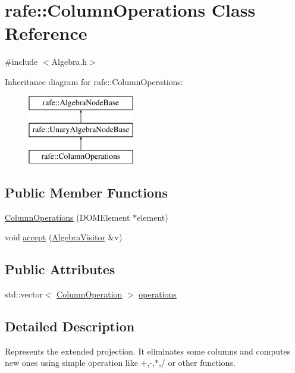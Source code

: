 \hypertarget{classrafe_1_1_column_operations}{\section{rafe\+:\+:Column\+Operations Class Reference}
\label{classrafe_1_1_column_operations}
}


{\ttfamily \#include $<$Algebra.\+h$>$}

Inheritance diagram for rafe\+:\+:Column\+Operations\+:\begin{figure}[H]
\begin{center}
\leavevmode
\includegraphics[height=3.000000cm]{classrafe_1_1_column_operations}
\end{center}
\end{figure}
\subsection*{Public Member Functions}
\begin{DoxyCompactItemize}
\item 
\hyperlink{classrafe_1_1_column_operations_a7032e4e6127e60bf523f5a5980459dab}{Column\+Operations} (D\+O\+M\+Element $\ast$element)
\item 
void \hyperlink{classrafe_1_1_column_operations_a3418a59f4befbb949bf14e08d9c7d895}{accept} (\hyperlink{classrafe_1_1_algebra_visitor}{Algebra\+Visitor} \&v)
\end{DoxyCompactItemize}
\subsection*{Public Attributes}
\begin{DoxyCompactItemize}
\item 
std\+::vector$<$ \hyperlink{classrafe_1_1_column_operation}{Column\+Operation} $>$ \hyperlink{classrafe_1_1_column_operations_adb374c76426222828c5b1a6b0f225246}{operations}
\end{DoxyCompactItemize}


\subsection{Detailed Description}
Represents the extended projection. It eliminates some columns and computes new ones using simple operation like +,-\/,$\ast$,/ or other functions. 

